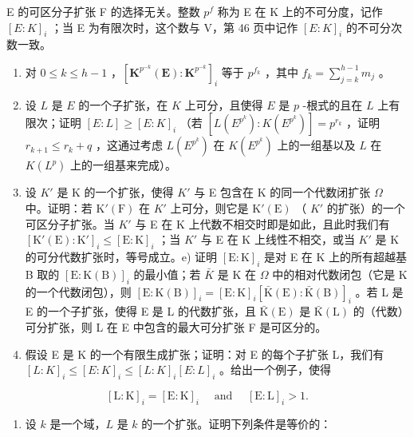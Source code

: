 E 的可区分子扩张 F 的选择无关。整数 \(p^{f}\) 称为 E 在 K 上的不可分度，记作 \([E:K]_{i}\) ；当 E 为有限次时，这个数与 V，第 46 页中记作 \([E:K]_{i}\) 的不可分次数一致。

\begin{enumerate}
\def\labelenumi{\alph{enumi})}
\setcounter{enumi}{1}
\item
  对 \(0 \leqslant k \leqslant h - 1\) ，\([\mathbf{K}^{p^{-k}}(\mathbf{E}) : \mathbf{K}^{p^{-k}}]_i\) 等于 \(p^{f_k}\) ，其中 \(f_k = \sum_{j=k}^{h-1} m_j\) 。
\item
  设 \(L\) 是 \(E\) 的一个子扩张，在 \(K\) 上可分，且使得 \(E\) 是 \(p\) -根式的且在 \(L\) 上有限次；证明 \([E:L] \geqslant [E:K]_i\) （若 \([L(E^{p^k}):K(E^{p^k})] = p^{r_k}\) ，证明 \(r_{k+1} \leqslant r_k + q\) ，这通过考虑 \(L(E^{p^k})\) 在 \(K(E^{p^k})\) 上的一组基以及 \(L\) 在 \(K(L^p)\) 上的一组基来完成）。
\item
  设 \(K'\) 是 K 的一个扩张，使得 \(K'\) 与 E 包含在 K 的同一个代数闭扩张 \(\Omega\) 中。证明：若 \(\mathrm{K}'(\mathrm{F})\) 在 \(K'\) 上可分，则它是 \(\mathrm{K}'(\mathrm{E})\) （ \(K'\) 的扩张）的一个可区分子扩张。当 \(K'\) 与 E 在 K 上代数不相交时即是如此，且此时我们有 \([\mathrm{K}'(\mathrm{E}):\mathrm{K}']_{i}\leqslant[\mathrm{E}:\mathrm{K}]_{i}\) ；当 \(K'\) 与 E 在 K 上线性不相交，或当 \(K'\) 是 K 的可分代数扩张时，等号成立。e) 证明 \([\mathrm{E}:\mathrm{K}]_{i}\) 是对 E 在 K 上的所有超越基 B 取的 \([\mathrm{E}:\mathrm{K}(\mathrm{B})]_{i}\) 的最小值；若 \(\bar{K}\) 是 K 在 \(\Omega\) 中的相对代数闭包（它是 K 的一个代数闭包），则 \([\mathrm{E}:\mathrm{K}(\mathrm{B})]_{i}=[\mathrm{E}:\mathrm{K}]_{i}[\bar{\mathrm{K}}(\mathrm{E}):\bar{\mathrm{K}}(\mathrm{B})]_{i}\) 。若 L 是 E 的一个子扩张，使得 E 是 L 的代数扩张，且 \(\bar{\mathrm{K}}(\mathrm{E})\) 是 \(\bar{\mathrm{K}}(\mathrm{L})\) 的（代数）可分扩张，则 L 在 E 中包含的最大可分扩张 F 是可区分的。
\item
  假设 E 是 K 的一个有限生成扩张；证明：对 E 的每个子扩张 L，我们有 \([L:K]_{i} \leqslant [E:K]_{i} \leqslant [L:K]_{i}[E:L]_{i}\) 。给出一个例子，使得
\end{enumerate}

\[
[ \mathrm{L}: \mathrm{K} ] _ {i} = [ \mathrm{E}: \mathrm{K} ] _ {i} \quad \text { and } \quad [ \mathrm{E}: \mathrm{L} ] _ {i} > 1.
\]

\begin{enumerate}
\def\labelenumi{\arabic{enumi})}
\setcounter{enumi}{7}
\tightlist
\item
  设 \(k\) 是一个域，\(L\) 是 \(k\) 的一个扩张。证明下列条件是等价的：
\end{enumerate}


